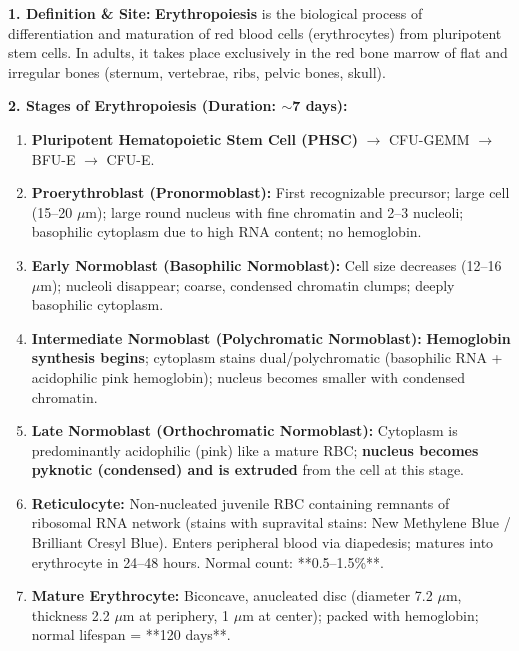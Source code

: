 \documentclass[11pt,a4paper]{article}
\begin{document}
\begin{ansbox}
\textbf{1. Definition \& Site:}
\textbf{Erythropoiesis} is the biological process of differentiation and maturation of red blood cells (erythrocytes) from pluripotent stem cells. In adults, it takes place exclusively in the red bone marrow of flat and irregular bones (sternum, vertebrae, ribs, pelvic bones, skull).

\textbf{2. Stages of Erythropoiesis (Duration: $\sim$7 days):}
\begin{enumerate}[leftmargin=*]
    \item \textbf{Pluripotent Hematopoietic Stem Cell (PHSC)} $\rightarrow$ CFU-GEMM $\rightarrow$ BFU-E $\rightarrow$ CFU-E.
    \item \textbf{Proerythroblast (Pronormoblast):} First recognizable precursor; large cell (15--20 $\mu$m); large round nucleus with fine chromatin and 2--3 nucleoli; basophilic cytoplasm due to high RNA content; no hemoglobin.
    \item \textbf{Early Normoblast (Basophilic Normoblast):} Cell size decreases (12--16 $\mu$m); nucleoli disappear; coarse, condensed chromatin clumps; deeply basophilic cytoplasm.
    \item \textbf{Intermediate Normoblast (Polychromatic Normoblast):} \textbf{Hemoglobin synthesis begins}; cytoplasm stains dual/polychromatic (basophilic RNA + acidophilic pink hemoglobin); nucleus becomes smaller with condensed chromatin.
    \item \textbf{Late Normoblast (Orthochromatic Normoblast):} Cytoplasm is predominantly acidophilic (pink) like a mature RBC; \textbf{nucleus becomes pyknotic (condensed) and is extruded} from the cell at this stage.
    \item \textbf{Reticulocyte:} Non-nucleated juvenile RBC containing remnants of ribosomal RNA network (stains with supravital stains: New Methylene Blue / Brilliant Cresyl Blue). Enters peripheral blood via diapedesis; matures into erythrocyte in 24--48 hours. Normal count: **0.5--1.5\%**.
    \item \textbf{Mature Erythrocyte:} Biconcave, anucleated disc (diameter 7.2 $\mu$m, thickness 2.2 $\mu$m at periphery, 1 $\mu$m at center); packed with hemoglobin; normal lifespan = **120 days**.
\end{enumerate}


\end{ansbox}
\end{document}
